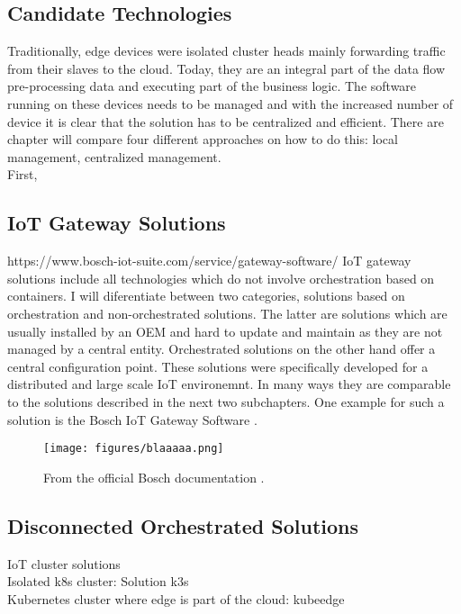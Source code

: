 \subsection{Candidate Technologies}
Traditionally, edge devices were isolated cluster heads mainly forwarding traffic from their slaves to the cloud. Today, they are an integral part of the data flow pre-processing data and executing part of the business logic. The software running on these devices needs to be managed and with the increased number of device it is clear that the solution has to be centralized and efficient. There are  chapter will compare four different approaches on how to do this: local management, centralized management. \\
First,

\subsection{IoT Gateway Solutions}
https://www.bosch-iot-suite.com/service/gateway-software/
IoT gateway solutions include all technologies which do not involve orchestration based on containers. I will diferentiate between two categories, solutions based on orchestration and non-orchestrated solutions. The latter are solutions which are usually installed by an OEM and hard to update and maintain as they are not managed by a central entity. Orchestrated solutions on the other hand offer a central configuration point. These solutions were specifically developed for a distributed and large scale IoT environemnt. In many ways they are comparable to the solutions described in the next two subchapters. One example for such a solution is the Bosch IoT Gateway Software \cite{BoschIoT13:online}.

\begin{figure}[h!]
    \centering
    \texttt{[image: figures/blaaaaa.png]}
    \caption{From the official Bosch documentation \cite{BoschIoT13:online}.}
    \label{fig:boschIoTGatewaySetup}
\end{figure}





\subsection{Disconnected Orchestrated Solutions}
IoT cluster solutions\\
Isolated k8s cluster: Solution k3s\\
Kubernetes cluster where edge is part of the cloud: kubeedge\\



